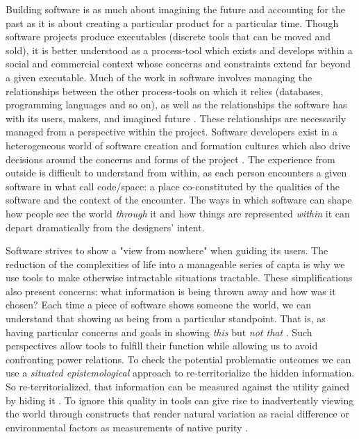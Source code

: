 \documentclass[a4paper,man,natbib]{apa6}
\begin{document}
   Building software is as much about imagining the future and accounting for the past as it is about creating a particular product for a particular time. Though software projects produce executables (discrete tools that can be moved and sold), it is better understood as a process-tool which exists and develops within a social and commercial context whose concerns and constraints extend far beyond a given executable. Much of the work in software involves managing the relationships between the other process-tools on which it relies (databases, programming languages and so on), as well as the relationships the software has with its users, makers, and imagined future \citep{Mackenzie2006-hb}. These relationships are necessarily managed from a perspective within the project. Software developers exist in a heterogeneous world of software creation and formation cultures which also drive decisions around the concerns and forms of the project \citep{Ensmenger2012-kz,Gabriella_Coleman2012-lq, Kelty2008-jm}. The experience from outside is difficult to understand from within, as each person encounters a given software in what \citet{Kitchin2011-af} call code/space: a place co-constituted by the qualities of the software and the context of the encounter. The ways in which software can shape how people see the world \textit{through} it and how things are represented \textit{within} it can depart dramatically from the designers' intent.

   Software strives to show a "view from nowhere" when guiding its users. The reduction of the complexities of life into a manageable series of \gls{capta} is why we use tools to make otherwise intractable situations tractable. These simplifications also present concerns: what information is being thrown away and how was it chosen? Each time a piece of software shows someone the world, we can understand that showing as being from a particular standpoint. That is, as having particular concerns and goals in showing \textit{this} but \textit{not that} \citep{Harding1992-od}. Such perspectives allow tools to fulfill their function while allowing us to avoid confronting power relations. To check the potential problematic outcomes we can use a \textit{situated epistemological} approach to re-territorialize the hidden information. So re-territorialized, that information can be measured against the utility gained by hiding it \citep{Haraway1988-nh}. To ignore this quality in tools can give rise to inadvertently viewing the world through constructs that render natural variation as racial difference or environmental factors as measurements of native purity \citep{Subramaniam2014-wg}.
\end{document}

